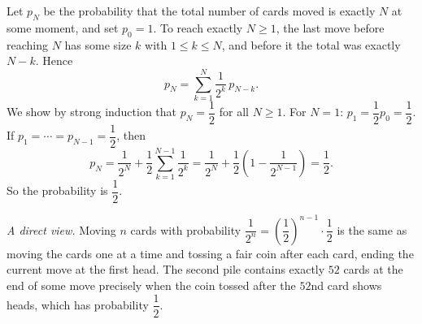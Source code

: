 Let $p_N$ be the probability that the total number of cards moved is exactly $N$ at some moment, and set $p_0=1$. To reach exactly $N\ge1$, the last move before reaching $N$ has some size $k$ with $1\le k\le N$, and before it the total was exactly $N-k$. Hence
\[p_N=\sum_{k=1}^{N}\dfrac{1}{2^k}\,p_{N-k}.\]
We show by strong induction that $p_N=\dfrac{1}{2}$ for all $N\ge1$. For $N=1$: $p_1=\dfrac{1}{2}p_0=\dfrac{1}{2}$. If $p_1=\cdots=p_{N-1}=\dfrac{1}{2}$, then
\[p_N=\dfrac{1}{2^N}+\dfrac{1}{2}\sum_{k=1}^{N-1}\dfrac{1}{2^k}=\dfrac{1}{2^N}+\dfrac{1}{2}\left(1-\dfrac{1}{2^{N-1}}\right)=\dfrac{1}{2} .\]
So the probability is $\boxed{\dfrac{1}{2}}$.

\emph{A direct view.} Moving $n$ cards with probability $\dfrac{1}{2^n}=\left(\dfrac{1}{2}\right)^{n-1}\cdot\dfrac{1}{2}$ is the same as moving the cards one at a time and tossing a fair coin after each card, ending the current move at the first head. The second pile contains exactly $52$ cards at the end of some move precisely when the coin tossed after the $52$nd card shows heads, which has probability $\dfrac{1}{2}$.
